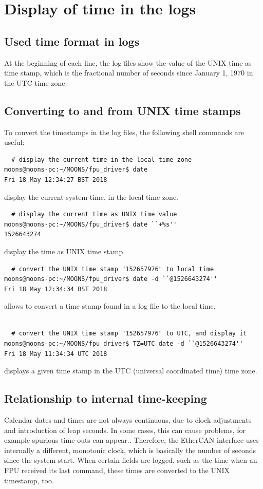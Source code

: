 \documentclass[fontsize=12,a4paper]{scrreprt}
\begin{document}
\section{Display of time in the logs}
\subsection{Used time format in logs}
At the beginning of each line, the log files show the value of the
UNIX time as time stamp, which is the fractional number of seconds
since January 1, 1970 in the UTC time zone.

\subsection{Converting to and from UNIX time stamps}

To convert the timestamps in the log files, the following
shell commands are useful:

\begin{verbatim}
  # display the current time in the local time zone
moons@moons-pc:~/MOONS/fpu_driver$ date
Fri 18 May 12:34:27 BST 2018
\end{verbatim}
display the current system time, in the local time zone.

\begin{verbatim}
  # display the current time as UNIX time value
moons@moons-pc:~/MOONS/fpu_driver$ date ``+%s''
1526643274
\end{verbatim}
display the time as UNIX time stamp.

\begin{verbatim}
  # convert the UNIX time stamp "152657976" to local time
moons@moons-pc:~/MOONS/fpu_driver$ date -d ``@1526643274''
Fri 18 May 12:34:34 BST 2018
\end{verbatim}
allows to convert a time stamp found in a log file to
the local time.

\begin{verbatim}

  # convert the UNIX time stamp "152657976" to UTC, and display it
moons@moons-pc:~/MOONS/fpu_driver$ TZ=UTC date -d ``@1526643274''
Fri 18 May 11:34:34 UTC 2018
\end{verbatim}
displays a given time stamp in the UTC (universal coordinated time)
time zone.

\subsection{Relationship to internal time-keeping}
Calendar dates and times are not always continuous, due to clock
adjustments and introduction of leap seconds. In some cases, this can
cause problems, for example spurious time-outs can appear.. Therefore,
the EtherCAN interface uses internally a different, monotonic clock, which is
basically the number of seconds since the system start. When certain
fields are logged, such as the time when an FPU received its last
command, these times are converted to the UNIX timestamp, too.
\end{document}
